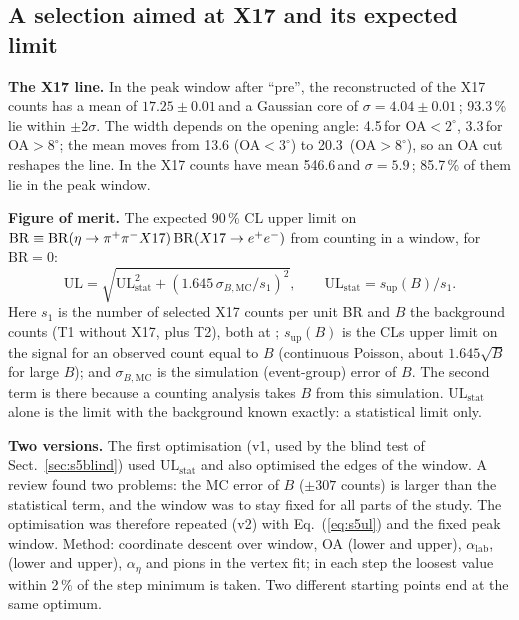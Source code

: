 \subsection{A selection aimed at X17 and its expected limit}
\label{sec:s5x17}
\textbf{The X17 line.} In the peak window after ``pre'', the reconstructed \Mee of the X17 counts has
a mean of $17.25\pm0.01$\,\MeVcc and a Gaussian core of $\sigma = 4.04\pm0.01$\,\MeVcc; 93.3\,\% lie
within $\pm2\sigma$. The width depends on the opening angle: 4.5\,\MeVcc for OA$<2^\circ$,
3.3\,\MeVcc for OA$>8^\circ$; the mean moves from 13.6 (OA$<3^\circ$) to 20.3\,\MeVcc
(OA$>8^\circ$), so an OA cut reshapes the line. In \Mfour the X17 counts have mean 546.6\,\MeVcc and
$\sigma = 5.9$\,\MeVcc; 85.7\,\% of them lie in the peak window.

\textbf{Figure of merit.} The expected 90\,\% CL upper limit on
$\mathrm{BR}\equiv\mathrm{BR}(\eta\to\pi^{+}\pi^{-} X17)\,\mathrm{BR}(X17\to e^{+}e^{-})$ from counting in a window,
for $\mathrm{BR}=0$:
\begin{equation}
\mathrm{UL} = \sqrt{\mathrm{UL}_{\mathrm{stat}}^2 + \left(1.645\,\sigma_{B,\mathrm{MC}}/s_1\right)^2},
\qquad \mathrm{UL}_{\mathrm{stat}} = s_{\mathrm{up}}(B)/s_1 .
\label{eq:s5ul}
\end{equation}
Here $s_1$ is the number of selected X17 counts per unit BR and $B$ the background counts (T1 without
X17, plus T2), both at \Ldata; $s_{\mathrm{up}}(B)$ is the CLs upper limit on the signal for an
observed count equal to $B$ (continuous Poisson, about $1.645\sqrt{B}$ for large $B$); and
$\sigma_{B,\mathrm{MC}}$ is the simulation (event-group) error of $B$. The second term is there
because a counting analysis takes $B$ from this simulation. $\mathrm{UL}_{\mathrm{stat}}$ alone is
the limit with the background known exactly: a statistical limit only.

\textbf{Two versions.} The first optimisation (v1, used by the blind test of
Sect.~\ref{sec:s5blind}) used $\mathrm{UL}_{\mathrm{stat}}$ and also optimised the edges of the
\Mfour window. A review found two problems: the MC error of $B$ ($\pm307$ counts) is larger than
the statistical term, and the \Mfour window was to stay fixed for all parts of the study. The
optimisation was therefore repeated (v2) with Eq.~(\ref{eq:s5ul}) and the fixed peak window.
Method: coordinate descent over \Mee window, OA (lower and upper), $\alpha_{\mathrm{lab}}$,
\Mpipi (lower and upper), $\alpha_\eta$ and pions in the vertex fit; in each step the loosest value
within 2\,\% of the step minimum is taken. Two different starting points end at the same optimum.

